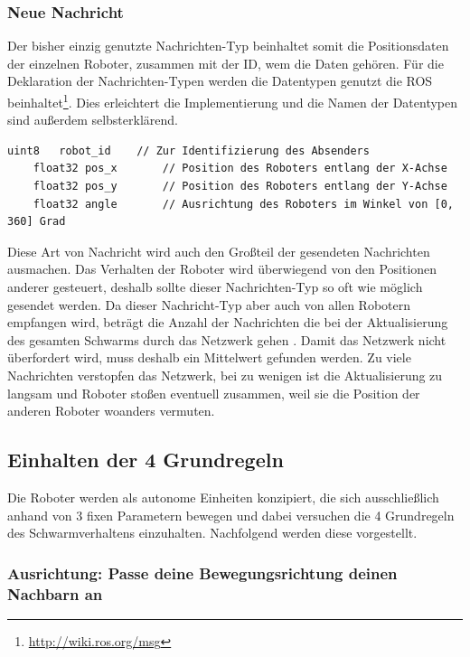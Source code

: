 \subsubsection*{Neue Nachricht}
Der bisher einzig genutzte Nachrichten-Typ beinhaltet somit die Positionsdaten der einzelnen Roboter, zusammen mit der ID, wem die Daten gehören. Für die Deklaration der Nachrichten-Typen werden die Datentypen genutzt die ROS beinhaltet\footnote{\url{http://wiki.ros.org/msg}}. Dies erleichtert die Implementierung und die Namen der Datentypen sind außerdem selbsterklärend.

\begin{lstlisting}[style=ros, title=Nachrichten-Typ: Robot\_Position]
	uint8	robot_id	// Zur Identifizierung des Absenders
	float32 pos_x		// Position des Roboters entlang der X-Achse
	float32 pos_y		// Position des Roboters entlang der Y-Achse
	float32 angle		// Ausrichtung des Roboters im Winkel von [0, 360] Grad
\end{lstlisting}

Diese Art von Nachricht wird auch den Großteil der gesendeten Nachrichten ausmachen. Das Verhalten der Roboter wird überwiegend von den Positionen anderer gesteuert, deshalb sollte dieser Nachrichten-Typ so oft wie möglich gesendet werden. Da dieser Nachricht-Typ aber auch von allen Robotern empfangen wird, beträgt die Anzahl der Nachrichten die bei der Aktualisierung des gesamten Schwarms durch das Netzwerk gehen . Damit das Netzwerk nicht überfordert wird, muss deshalb ein Mittelwert gefunden werden. Zu viele Nachrichten verstopfen das Netzwerk, bei zu wenigen ist die Aktualisierung zu langsam und Roboter stoßen eventuell zusammen, weil sie die Position der anderen Roboter woanders vermuten.

\subsection*{Einhalten der 4 Grundregeln}
Die Roboter werden als autonome Einheiten konzipiert, die sich ausschließlich anhand von 3 fixen Parametern bewegen und dabei versuchen die 4 Grundregeln des Schwarmverhaltens einzuhalten. Nachfolgend werden diese vorgestellt.

\subsubsection*{Ausrichtung: Passe deine Bewegungsrichtung deinen Nachbarn an}

